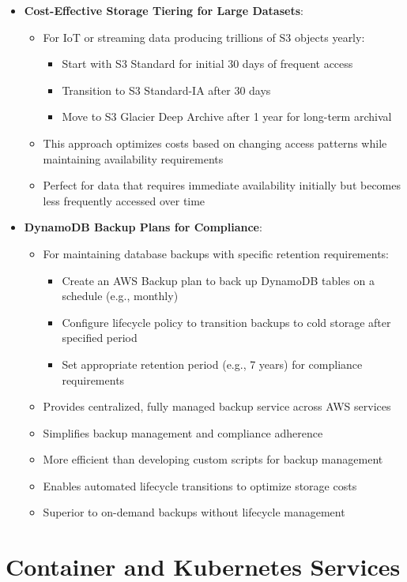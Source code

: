 \documentclass[11pt,a4paper]{report}
\begin{document}
\begin{itemize}
  \item \textbf{Cost-Effective Storage Tiering for Large Datasets}:
\begin{itemize}
  \item For IoT or streaming data producing trillions of S3 objects yearly:
\begin{itemize}
  \item Start with S3 Standard for initial 30 days of frequent access
  \item Transition to S3 Standard-IA after 30 days
  \item Move to S3 Glacier Deep Archive after 1 year for long-term archival
\end{itemize}
  \item This approach optimizes costs based on changing access patterns while maintaining availability requirements
  \item Perfect for data that requires immediate availability initially but becomes less frequently accessed over time
\end{itemize}
  \item \textbf{DynamoDB Backup Plans for Compliance}:
\begin{itemize}
  \item For maintaining database backups with specific retention requirements:
\begin{itemize}
  \item Create an AWS Backup plan to back up DynamoDB tables on a schedule (e.g., monthly)
  \item Configure lifecycle policy to transition backups to cold storage after specified period
  \item Set appropriate retention period (e.g., 7 years) for compliance requirements
\end{itemize}
  \item Provides centralized, fully managed backup service across AWS services
  \item Simplifies backup management and compliance adherence
  \item More efficient than developing custom scripts for backup management
  \item Enables automated lifecycle transitions to optimize storage costs
  \item Superior to on-demand backups without lifecycle management
\end{itemize}
\end{itemize}

\chapter{Container and Kubernetes Services}
\end{document}
